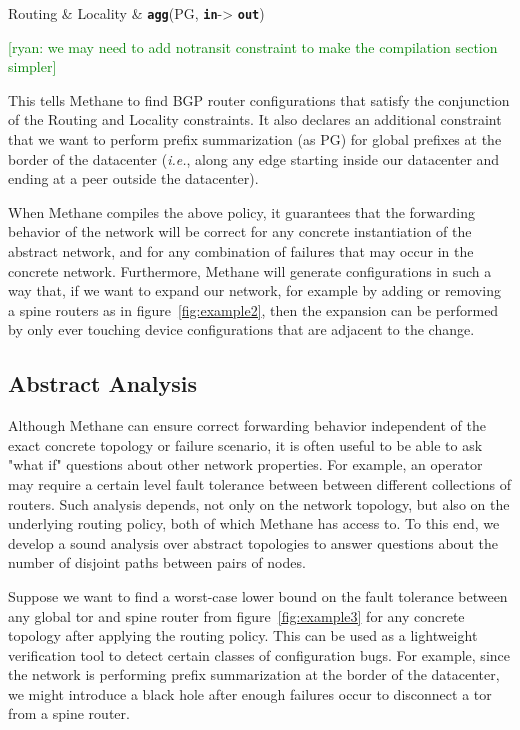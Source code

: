 \documentclass{sig-alternate-10pt}
\newcommand{\ryan}[1]{\textcolor{green}{[ryan: #1]}}
\newcommand{\IE}{\emph{i.e.}}
\newcommand{\sysname}{{\small \sf Methane}\xspace}
\newcommand{\KW}[1]{\texttt{\small\bfseries{#1}}}
\newcommand{\Agg}{\KW{agg}}
\newcommand{\In}{\KW{in}}
\newcommand{\Out}{\KW{out}}
\begin{document}
\begin{code}
Routing & Locality & \Agg(PG, \In -> \Out)
\end{code}
\noindent%

\ryan{we may need to add notransit constraint to make the compilation section simpler}

This tells \sysname to find BGP router configurations that satisfy the conjunction of the Routing and Locality constraints. It also declares an additional constraint that we want to perform prefix summarization (as PG) for global prefixes at the border of the datacenter (\IE, along any edge starting inside our datacenter and ending at a peer outside the datacenter).

When \sysname compiles the above policy, it guarantees that the forwarding behavior of the network will be correct for any concrete instantiation of the abstract network, and for any combination of failures that may occur in the concrete network. Furthermore, \sysname will generate configurations in such a way that, if we want to expand our network, for example by adding or removing a spine routers as in figure~\ref{fig:example2}, then the expansion can be performed by only ever touching device configurations that are adjacent to the change.

\subsection{Abstract Analysis}

Although \sysname can ensure correct forwarding behavior independent of the exact concrete topology or failure scenario, it is often useful to be able to ask "what if" questions about other network properties. For example, an operator may require a certain level fault tolerance between between different collections of routers. Such analysis depends, not only on the network topology, but also on the underlying routing policy, both of which \sysname has access to. To this end, we develop a sound analysis over abstract topologies to answer questions about the number of disjoint paths between pairs of nodes.

Suppose we want to find a worst-case lower bound on the fault tolerance between any global tor and spine router from figure~\ref{fig:example3} for any concrete topology after applying the routing policy. This can be used as a lightweight verification tool to detect certain classes of configuration bugs. For example, since the network is performing prefix summarization at the border of the datacenter, we might introduce a black hole after enough failures occur to disconnect a tor from a spine router.
\end{document}
